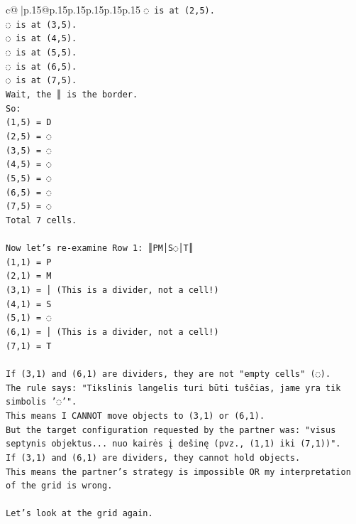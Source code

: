 \documentclass{article}
\begin{document}
{\begin{supertabular}{c@{$\;$}|p{.15\linewidth}@{}p{.15\linewidth}p{.15\linewidth}p{.15\linewidth}p{.15\linewidth}p{.15\linewidth}}
{{{\texttt{◌ is at (2,5).} \\
\texttt{◌ is at (3,5).} \\
\texttt{◌ is at (4,5).} \\
\texttt{◌ is at (5,5).} \\
\texttt{◌ is at (6,5).} \\
\texttt{◌ is at (7,5).} \\
\texttt{Wait, the ║ is the border.} \\
\texttt{So:} \\
\texttt{(1,5) = D} \\
\texttt{(2,5) = ◌} \\
\texttt{(3,5) = ◌} \\
\texttt{(4,5) = ◌} \\
\texttt{(5,5) = ◌} \\
\texttt{(6,5) = ◌} \\
\texttt{(7,5) = ◌} \\
\texttt{Total 7 cells.} \\
\\ 
\texttt{Now let's re{-}examine Row 1: ║PM│S◌│T║} \\
\texttt{(1,1) = P} \\
\texttt{(2,1) = M} \\
\texttt{(3,1) = │ (This is a divider, not a cell!)} \\
\texttt{(4,1) = S} \\
\texttt{(5,1) = ◌} \\
\texttt{(6,1) = │ (This is a divider, not a cell!)} \\
\texttt{(7,1) = T} \\
\\ 
\texttt{If (3,1) and (6,1) are dividers, they are not "empty cells" (◌).} \\
\texttt{The rule says: "Tikslinis langelis turi būti tuščias, jame yra tik simbolis '◌'".} \\
\texttt{This means I CANNOT move objects to (3,1) or (6,1).} \\
\texttt{But the target configuration requested by the partner was: "visus septynis objektus... nuo kairės į dešinę (pvz., (1,1) iki (7,1))".} \\
\texttt{If (3,1) and (6,1) are dividers, they cannot hold objects.} \\
\texttt{This means the partner's strategy is impossible OR my interpretation of the grid is wrong.} \\
\\ 
\texttt{Let's look at the grid again.} \\
}}}
\end{supertabular}}
\end{document}
